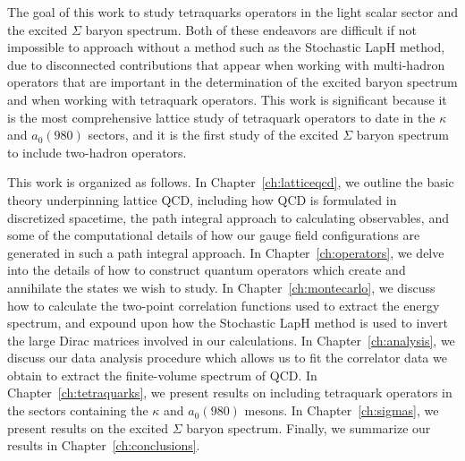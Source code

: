 The goal of this work to study tetraquarks operators in the light scalar sector and the excited $\Sigma$ baryon spectrum. Both of these endeavors are difficult if not impossible to approach without a method such as the Stochastic LapH method, due to disconnected contributions that appear when working with multi-hadron operators that are important in the determination of the excited baryon spectrum and when working with tetraquark operators. This work is significant because it is the most comprehensive lattice study of tetraquark operators to date in the $\kappa$ and $a_0(980)$ sectors, and it is the first study of the excited $\Sigma$ baryon spectrum to include two-hadron operators.

This work is organized as follows. In Chapter~\ref{ch:latticeqcd}, we outline the basic theory underpinning lattice QCD, including how QCD is formulated in discretized spacetime, the path integral approach to calculating observables, and some of the computational details of how our gauge field configurations are generated in such a path integral approach. In Chapter~\ref{ch:operators}, we delve into the details of how to construct quantum operators which create and annihilate the states we wish to study. In Chapter~\ref{ch:montecarlo}, we discuss how to calculate the two-point correlation functions used to extract the energy spectrum, and expound upon how the Stochastic LapH method is used to invert the large Dirac matrices involved in our calculations. In Chapter~\ref{ch:analysis}, we discuss our data analysis procedure which allows us to fit the correlator data we obtain to extract the finite-volume spectrum of QCD. In Chapter~\ref{ch:tetraquarks}, we present results on including tetraquark operators in the sectors containing the $\kappa$ and $a_0(980)$ mesons. In Chapter~\ref{ch:sigmas}, we present results on the excited $\Sigma$ baryon spectrum. Finally, we summarize our results in Chapter~\ref{ch:conclusions}.